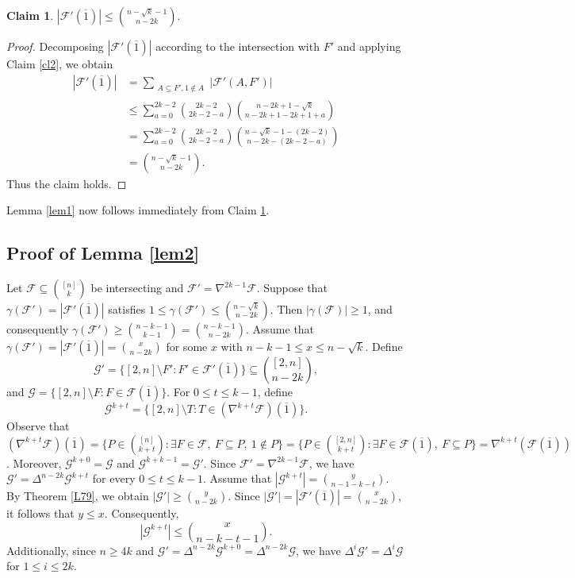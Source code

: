 \documentclass[11pt]{article}
\numberwithin{equation}{section}
\newtheorem{claim}{Claim}[section]
\begin{document}
\begin{claim}\label{cl3}
$
|\mathcal{F}'(\overline{1})| \le \binom{n - \sqrt{k} - 1}{n - 2k}.
$
\end{claim}

\begin{proof}
Decomposing $|\mathcal{F}'(\overline{1})|$ according to the intersection with $F'$ and applying Claim \ref{cl2}, we obtain
$$
\begin{aligned}
|\mathcal{F}'(\overline{1})| &= \sum_{\substack{A \subseteq F' , 1 \notin A}} |\mathcal{F}'(A, F')| \\
&\le \sum_{a=0}^{2k-2} \binom{2k-2}{2k-2-a} \binom{n - 2k + 1 - \sqrt{k}}{n - 2k + 1 - 2k + 1 + a} \\
&= \sum_{a=0}^{2k-2} \binom{2k-2}{2k-2-a} \binom{n - \sqrt{k} - 1 - (2k-2)}{n - 2k - (2k-2 - a)} \\
&= \binom{n - \sqrt{k} - 1}{n - 2k}.
\end{aligned}
$$
Thus the claim holds.
\end{proof}

Lemma \ref{lem1} now follows immediately from Claim  \ref{cl3}.

    



    
	\subsection{Proof of Lemma \ref{lem2}}
    Let  $\mathcal{F}\subseteq \binom{[n]}{k}$ be intersecting  and $\mathcal{F}' = \nabla^{2k-1}\mathcal{F}$.
	Suppose that $\gamma(\mathcal{F}') = |\mathcal{F}'(\overline{1})|$ satisfies
$
1 \le \gamma(\mathcal{F}') \le \binom{n - \sqrt{k}}{n - 2k}.
$
Then $|\gamma(\mathcal{F})|\ge 1$, and consequently
$\gamma(\mathcal{F}')\ge\binom{n-k-1}{k-1}=\binom{n-k-1}{n-2k}$.
Assume that $\gamma({\mathcal{F}'})=|\mathcal{F}'(\overline1)|=\binom{x}{n-2k}$ for some $x$ with $n-k-1\le x\le n-\sqrt{k}.$
Define
$$
\mathcal{G}' = \{[2,n] \setminus F' : F' \in \mathcal{F}'(\overline{1})\} \subseteq \binom{[2,n]}{n-2k},
$$
and $\mathcal{G} = \{[2,n] \setminus F : F \in \mathcal{F}(\overline{1})\}$. 
For  $0\le t\le k-1$, define
 $$\mathcal{G}^{k+t}=\{[2, n] \setminus T : T \in (\nabla^{k+t}\mathcal{F})(\overline{1})\}.$$ 
Observe that $(\nabla^{k+t}\mathcal{F})(\overline{1})=\{P\in\binom{[n]}{k+t} :\exists F \in \mathcal{F}, \ F\subseteq P,\ 1\notin P\}=\{P\in\binom{[2, n]}{k+t} :\exists F \in \mathcal{F}(\overline{1}), \ F\subseteq P\}=\nabla^{k+t}(\mathcal{F}(\overline{1}))
$.
Moreover,  $\mathcal{G}^{k+0}=\mathcal{G}$ and $\mathcal{G}^{k+k-1}=\mathcal{G}'$.
	  Since $\mathcal{F}'=\nabla^{2k-1}\mathcal{F}$, we have $\mathcal{G}'=\Delta^{n-2k}{\mathcal{G}^{k+t}}$ for every $0 \leq t\leq k-1$.
      Assume that $|\mathcal{G}^{k+t}|=\binom{y}{n-1-k-t}$. By Theorem \ref{L79}, we obtain $|\mathcal{G}'|\geq \binom{y}{n-2k}$.
      Since $|\mathcal{G}'|=|\mathcal{F}'(\overline1)|=\binom{x}{n-2k} $, it follows that $y\leq x$.
Consequently,  $$|\mathcal{G}^{k+t}|\le \binom{x}{n-k-t-1}.$$ Additionally, since  $n\ge 4k$ and $\mathcal{G}'=\Delta^{n-2k}{\mathcal{G}^{k+0}}=\Delta^{n-2k}{\mathcal{G}}$,  we have $\Delta^i{\mathcal{G}'}=\Delta^i{\mathcal{G}}$ for $1\le i \le 2k$.
	
\end{document}
